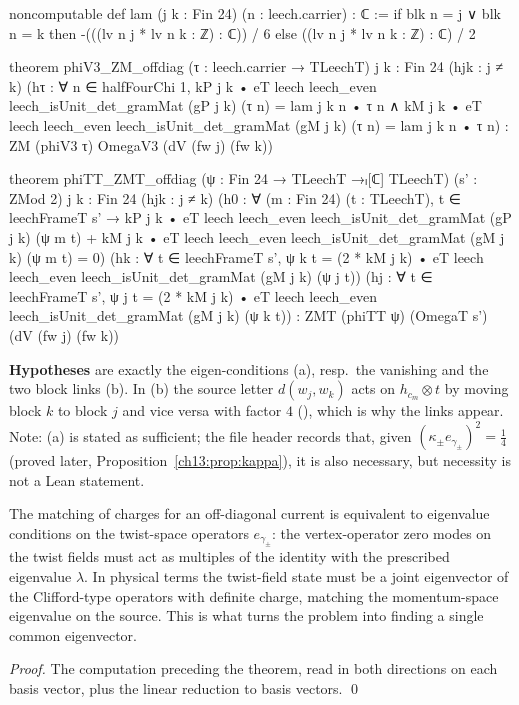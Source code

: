 \begin{leancode}
noncomputable def lam (j k : Fin 24) (n : leech.carrier) : ℂ :=
  if blk n = j ∨ blk n = k then -(((lv n j * lv n k : ℤ) : ℂ)) / 6 else ((lv n j * lv n k : ℤ) : ℂ) / 2

theorem phiV3_ZM_offdiag (τ : leech.carrier → TLeechT) {j k : Fin 24} (hjk : j ≠ k)
    (hτ : ∀ n ∈ halfFourChi 1,
      kP j k • eT leech leech_even leech_isUnit_det_gramMat (gP j k) (τ n) = lam j k n • τ n ∧
      kM j k • eT leech leech_even leech_isUnit_det_gramMat (gM j k) (τ n) = lam j k n • τ n) :
    ZM (phiV3 τ) OmegaV3 (dV (fw j) (fw k))

theorem phiTT_ZMT_offdiag (ψ : Fin 24 → TLeechT →ₗ[ℂ] TLeechT) (s' : ZMod 2) {j k : Fin 24}
    (hjk : j ≠ k)
    (h0 : ∀ (m : Fin 24) (t : TLeechT), t ∈ leechFrameT s' →
      kP j k • eT leech leech_even leech_isUnit_det_gramMat (gP j k) (ψ m t)
        + kM j k • eT leech leech_even leech_isUnit_det_gramMat (gM j k) (ψ m t) = 0)
    (hk : ∀ t ∈ leechFrameT s', ψ k t = (2 * kM j k) • eT leech leech_even leech_isUnit_det_gramMat (gM j k) (ψ j t))
    (hj : ∀ t ∈ leechFrameT s', ψ j t = (2 * kM j k) • eT leech leech_even leech_isUnit_det_gramMat (gM j k) (ψ k t)) :
    ZMT (phiTT ψ) (OmegaT s') (dV (fw j) (fw k))
\end{leancode}
\begin{dictionary}
\textbf{Hypotheses} are exactly the eigen-conditions (a), resp.\ the vanishing and the two block links
(b). In (b) the source letter $d(w_j,w_k)$ acts on $h_{c_m}\otimes t$ by moving block $k$ to block $j$ and
vice versa with factor $4$ (), which is why the links appear. Note: (a) is stated as
sufficient; the file header records that, given $(\kappa_\pm e_{\gamma_\pm})^2=\tfrac14$
(proved later, Proposition~\ref{ch13:prop:kappa}), it is also necessary, but necessity is not a Lean
statement.
\end{dictionary}
\begin{physics}
The matching of charges for an off-diagonal current is equivalent to eigenvalue conditions on the twist-space operators $e_{\gamma_\pm}$: the vertex-operator zero modes on the twist fields must act as multiples of the identity with the prescribed eigenvalue $\lambda$. In physical terms the twist-field state must be a joint eigenvector of the Clifford-type operators with definite charge, matching the momentum-space eigenvalue on the source. This is what turns the problem into finding a single common eigenvector.
\end{physics}
\noindent\emph{Proof.} The computation preceding the theorem, read in both directions on each basis
vector, plus the linear reduction to basis vectors. \qed

